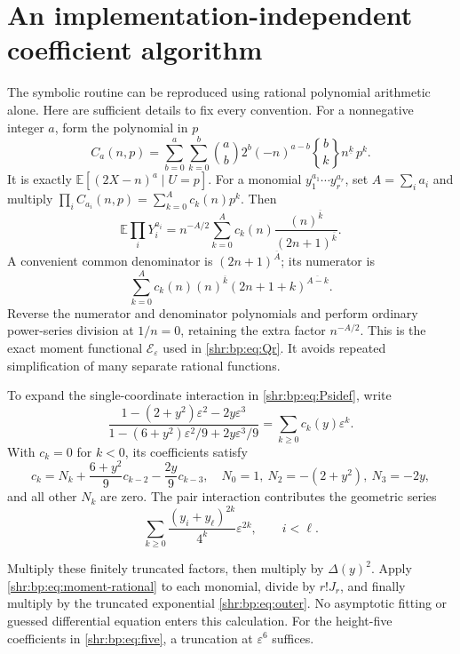 \documentclass[11pt,letterpaper]{article}
\numberwithin{equation}{section}
\theoremstyle{definition}
\newcommand{\E}{\mathbb E}
\newcommand{\1}{\mathbf 1}
\newcommand{\fall}[2]{#1^{\underline{#2}}}
\newcommand{\eps}{\varepsilon}
\newcommand{\rise}[2]{(#1)^{\overline{#2}}}
\newcommand{\Stirling}[2]{\genfrac{\{}{\}}{0pt}{}{#1}{#2}}
\begin{document}
\section{An implementation-independent coefficient algorithm}
\label{shr:bp:app:algorithm}
The symbolic routine can be reproduced using rational polynomial
arithmetic alone. Here are sufficient details to fix every convention.
For a nonnegative integer $a$, form the polynomial in $p$
\begin{equation}
 C_a(n,p)=\sum_{b=0}^a\sum_{k=0}^b
 \binom ab2^b(-n)^{a-b}\Stirling{b}{k}\fall nk\,p^k.
 \label{shr:bp:eq:centeredC}
\end{equation}
It is exactly $\E[(2X-n)^a\mid U=p]$.
For a monomial $y_1^{a_1}\cdots y_r^{a_r}$, set $A=\sum_i a_i$ and
multiply $\prod_i C_{a_i}(n,p)=\sum_{k=0}^A c_k(n)p^k$.
Then
\begin{equation}
 \E\prod_iY_i^{a_i}
 =n^{-A/2}\sum_{k=0}^A c_k(n)
 \frac{\rise nk}{\rise{2n+1}k}.
 \label{shr:bp:eq:moment-rational}
\end{equation}
A convenient common denominator is $\rise{2n+1}A$; its numerator is
\begin{equation}
 \sum_{k=0}^A c_k(n)\rise nk\rise{2n+1+k}{A-k}.
 \label{shr:bp:eq:moment-numerator}
\end{equation}
Reverse the numerator and denominator polynomials and perform ordinary
power-series division at $1/n=0$, retaining the extra factor $n^{-A/2}$.
This is the exact moment functional $\mathcal E_\eps$ used in
\eqref{shr:bp:eq:Qr}. It avoids repeated simplification of many separate
rational functions.

To expand the single-coordinate interaction in \eqref{shr:bp:eq:Psidef}, write
\begin{equation}
 \frac{1-(2+y^2)\eps^2-2y\eps^3}
 {1-(6+y^2)\eps^2/9+2y\eps^3/9}
 =\sum_{k\ge0}c_k(y)\eps^k.
 \label{shr:bp:eq:single-series}
\end{equation}
With $c_k=0$ for $k<0$, its coefficients satisfy
\begin{equation}
 c_k=N_k+\frac{6+y^2}{9}c_{k-2}-\frac{2y}{9}c_{k-3},
 \quad
 N_0=1,\ N_2=-(2+y^2),\ N_3=-2y,
 \label{shr:bp:eq:single-rec}
\end{equation}
and all other $N_k$ are zero. The pair interaction contributes the
geometric series
\[
 \sum_{k\ge0}\frac{(y_i+y_\ell)^{2k}}{4^k}\eps^{2k},\qquad i<\ell.
\]

Multiply these finitely truncated factors, then multiply by
$\Delta(y)^2$. Apply \eqref{shr:bp:eq:moment-rational} to each monomial, divide
by $r!J_r$, and finally multiply by the truncated exponential
\eqref{shr:bp:eq:outer}. No asymptotic fitting or guessed differential equation
enters this calculation. For the height-five coefficients in
\eqref{shr:bp:eq:five}, a truncation at $\eps^6$ suffices.
\end{document}
